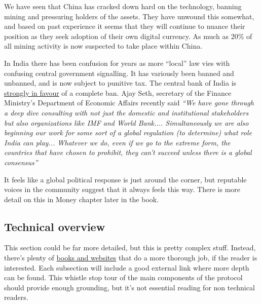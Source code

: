 We have seen that China has cracked down hard on the technology, banning mining and pressuring holders of the assets. They have unwound this somewhat, and based on past experience it seems that they will continue to nuance their position as they seek adoption of their own digital currency. As much as 20\% of all mining activity is now suspected to take place within China.\par
In India there has been confusion for years as more ``local'' law vies with confusing central government signalling. It has variously been banned and unbanned, and is now subject to punitive tax. The central bank of India is \href{http://164.100.24.220/loksabhaquestions/annex/179/AS10.pdf}{strongly in favour} of a complete ban. Ajay Seth, secretary of the Finance Ministry's Department of Economic Affairs recently said \textit{``We have gone through a deep dive consulting with not just the domestic and institutional stakeholders but also organizations like IMF and World Bank.... Simultaneously we are also beginning our work for some sort of a global regulation (to determine) what role India can play... Whatever we do, even if we go to the extreme form, the countries that have chosen to prohibit, they can't succeed unless there is a global consensus''}\par
It feels like a global political response is just around the corner, but reputable voices in the community suggest that it always feels this way. There is more detail on this in Money chapter later in the book.
\subsection{Technical overview}
This section could be far more detailed, but this is pretty complex stuff. Instead, there's plenty of \href{https://github.com/bitcoinbook/bitcoinbook}{books and websites} that do a more thorough job, if the reader is interested. Each subsection will include a good external link where more depth can be found. This whistle stop tour of the main components of the protocol should provide enough grounding, but it's not essential reading for non technical readers.\par
